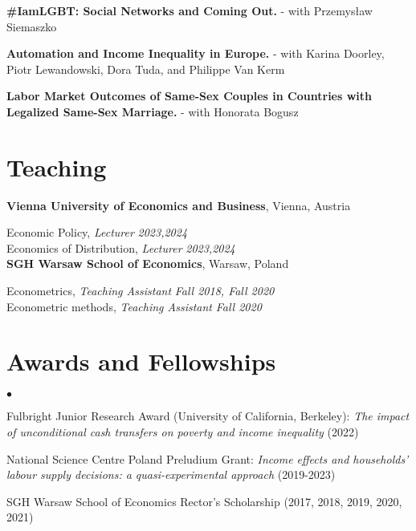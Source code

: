 \documentclass[margin,line]{res}
\newenvironment{list2}{
  \begin{list}{$\bullet$}{%
      \setlength{\itemsep}{0in}
      \setlength{\parsep}{0in} \setlength{\parskip}{0in}
      \setlength{\topsep}{0in} \setlength{\partopsep}{0in} 
      \setlength{\leftmargin}{0.2in}}}{\end{list}}
\begin{document}
\begin{resume}
\textbf{\#IamLGBT: Social Networks and Coming Out.} - with Przemysław Siemaszko 

\textbf{Automation and Income Inequality in Europe.} - with Karina Doorley, Piotr Lewandowski, Dora Tuda, and Philippe Van Kerm 

\textbf{Labor Market Outcomes of Same-Sex Couples in Countries with Legalized Same-Sex Marriage.} - with Honorata Bogusz 

\vspace*{.05in} 




\section{\sc Teaching}
{\bf Vienna University of Economics and Business}, Vienna, Austria

\vspace{-.3cm}
Economic Policy, \textit{Lecturer} \hfill \textit{2023,2024}\\
Economics of Distribution, \textit{Lecturer} \hfill \textit{2023,2024}\\

{\bf SGH Warsaw School of Economics}, Warsaw, Poland

\vspace{-.3cm}
Econometrics, \textit{Teaching Assistant} \hfill \textit{Fall 2018, Fall 2020}\\
Econometric methods, \textit{Teaching Assistant} \hfill \textit{Fall 2020}\\

\vspace*{.05in}  
\section{\sc Awards and Fellowships} 
\begin{list2}
\item Fulbright Junior Research Award (University of California, Berkeley): \textit{The impact of unconditional cash transfers on poverty and income inequality} (2022)
\item National Science Centre Poland Preludium Grant: \textit{Income effects and households' labour supply decisions: a quasi-experimental approach} (2019-2023)
\item SGH Warsaw School of Economics Rector's Scholarship (2017, 2018, 2019, 2020, 2021)
\end{list2}
\vspace*{.05in} 

\end{resume}
\end{document}

